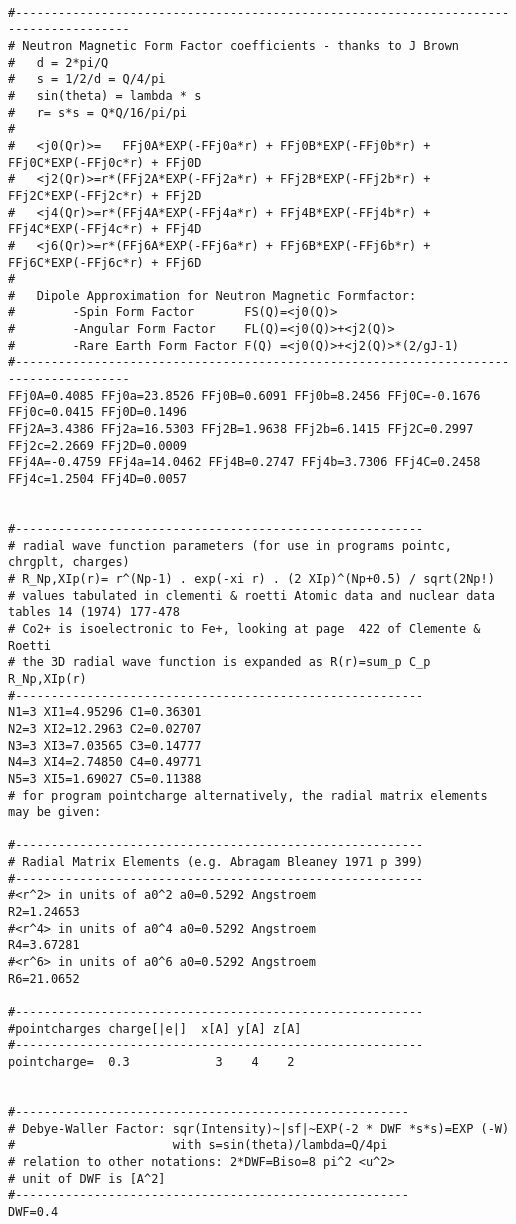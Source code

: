 {\begin{verbatim}
 
#--------------------------------------------------------------------------------------
# Neutron Magnetic Form Factor coefficients - thanks to J Brown
#   d = 2*pi/Q      
#   s = 1/2/d = Q/4/pi   
#   sin(theta) = lambda * s
#   r= s*s = Q*Q/16/pi/pi
#
#   <j0(Qr)>=   FFj0A*EXP(-FFj0a*r) + FFj0B*EXP(-FFj0b*r) + FFj0C*EXP(-FFj0c*r) + FFj0D
#   <j2(Qr)>=r*(FFj2A*EXP(-FFj2a*r) + FFj2B*EXP(-FFj2b*r) + FFj2C*EXP(-FFj2c*r) + FFj2D
#   <j4(Qr)>=r*(FFj4A*EXP(-FFj4a*r) + FFj4B*EXP(-FFj4b*r) + FFj4C*EXP(-FFj4c*r) + FFj4D
#   <j6(Qr)>=r*(FFj6A*EXP(-FFj6a*r) + FFj6B*EXP(-FFj6b*r) + FFj6C*EXP(-FFj6c*r) + FFj6D
#
#   Dipole Approximation for Neutron Magnetic Formfactor:
#        -Spin Form Factor       FS(Q)=<j0(Q)>
#        -Angular Form Factor    FL(Q)=<j0(Q)>+<j2(Q)>
#        -Rare Earth Form Factor F(Q) =<j0(Q)>+<j2(Q)>*(2/gJ-1)
#--------------------------------------------------------------------------------------
FFj0A=0.4085 FFj0a=23.8526 FFj0B=0.6091 FFj0b=8.2456 FFj0C=-0.1676 FFj0c=0.0415 FFj0D=0.1496     
FFj2A=3.4386 FFj2a=16.5303 FFj2B=1.9638 FFj2b=6.1415 FFj2C=0.2997 FFj2c=2.2669 FFj2D=0.0009     
FFj4A=-0.4759 FFj4a=14.0462 FFj4B=0.2747 FFj4b=3.7306 FFj4C=0.2458 FFj4c=1.2504 FFj4D=0.0057 


#---------------------------------------------------------
# radial wave function parameters (for use in programs pointc, chrgplt, charges) 
# R_Np,XIp(r)= r^(Np-1) . exp(-xi r) . (2 XIp)^(Np+0.5) / sqrt(2Np!)  
# values tabulated in clementi & roetti Atomic data and nuclear data tables 14 (1974) 177-478
# Co2+ is isoelectronic to Fe+, looking at page  422 of Clemente & Roetti 
# the 3D radial wave function is expanded as R(r)=sum_p C_p R_Np,XIp(r)
#---------------------------------------------------------
N1=3 XI1=4.95296 C1=0.36301 
N2=3 XI2=12.2963 C2=0.02707 
N3=3 XI3=7.03565 C3=0.14777
N4=3 XI4=2.74850 C4=0.49771 
N5=3 XI5=1.69027 C5=0.11388 
# for program pointcharge alternatively, the radial matrix elements may be given:

#---------------------------------------------------------
# Radial Matrix Elements (e.g. Abragam Bleaney 1971 p 399)
#---------------------------------------------------------
#<r^2> in units of a0^2 a0=0.5292 Angstroem
R2=1.24653
#<r^4> in units of a0^4 a0=0.5292 Angstroem
R4=3.67281
#<r^6> in units of a0^6 a0=0.5292 Angstroem
R6=21.0652

#---------------------------------------------------------
#pointcharges charge[|e|]  x[A] y[A] z[A]
#---------------------------------------------------------
pointcharge=  0.3            3    4    2


#-------------------------------------------------------
# Debye-Waller Factor: sqr(Intensity)~|sf|~EXP(-2 * DWF *s*s)=EXP (-W)
#                      with s=sin(theta)/lambda=Q/4pi
# relation to other notations: 2*DWF=Biso=8 pi^2 <u^2>
# unit of DWF is [A^2]
#-------------------------------------------------------
DWF=0.4
\end{verbatim}
}
